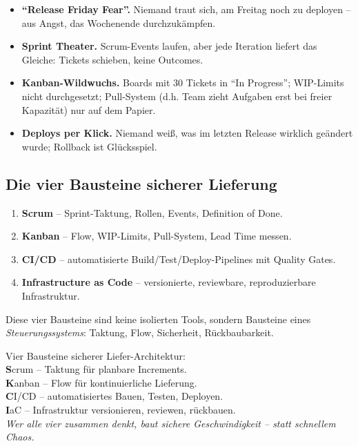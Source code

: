 \documentclass[11pt,a4paper,oneside]{article}
\newcommand{\caveatfontfallback}{\itshape}
\newcommand\caveatfont{\caveatfontfallback}%
\newcommand{\akzent}[1]{{\caveatfont\color{lpAmber}#1}}
\newcommand{\fachbegriff}[1]{\textbf{#1}}
\begin{document}
\begin{itemize}
  \item \fachbegriff{``Release Friday Fear''.} Niemand traut sich, am Freitag noch zu deployen -- aus Angst, das Wochenende durchzukämpfen.
  \item \fachbegriff{Sprint Theater.} Scrum-Events laufen, aber jede Iteration liefert das Gleiche: Tickets schieben, keine Outcomes.
  \item \fachbegriff{Kanban-Wildwuchs.} Boards mit 30 Tickets in ``In Progress''; WIP-Limits nicht durchgesetzt; Pull-System (d.h. Team zieht Aufgaben erst bei freier Kapazität) nur auf dem Papier.
  \item \fachbegriff{Deploys per Klick.} Niemand weiß, was im letzten Release wirklich geändert wurde; Rollback ist Glücksspiel.
\end{itemize}

\subsection{Die vier Bausteine sicherer Lieferung}

\begin{enumerate}
  \item \fachbegriff{Scrum} -- Sprint-Taktung, Rollen, Events, Definition of Done.
  \item \fachbegriff{Kanban} -- Flow, WIP-Limits, Pull-System, Lead Time messen.
  \item \fachbegriff{CI/CD} -- automatisierte Build/Test/Deploy-Pipelines mit Quality Gates.
  \item \fachbegriff{Infrastructure as Code} -- versionierte, reviewbare, reproduzierbare Infrastruktur.
\end{enumerate}

Diese vier Bausteine sind keine isolierten Tools, sondern Bausteine eines \emph{Steuerungssystems}: Taktung, Flow, Sicherheit, Rückbaubarkeit.

\begin{eselsbox}[Eselsbrücke: \akzent{S-K-C-I}]
Vier Bausteine sicherer Liefer-Architektur:\\[2pt]
\textbf{S}crum -- Taktung für planbare Increments.\\
\textbf{K}anban -- Flow für kontinuierliche Lieferung.\\
\textbf{C}I/CD -- automatisiertes Bauen, Testen, Deployen.\\
\textbf{I}aC -- Infrastruktur versionieren, reviewen, rückbauen.\\[2pt]
\emph{Wer alle vier zusammen denkt, baut sichere Geschwindigkeit -- statt schnellem Chaos.}
\end{eselsbox}
\end{document}
